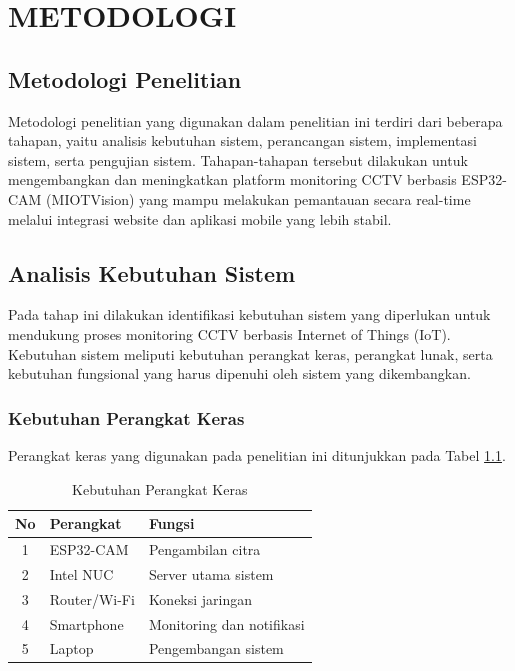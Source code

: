 \chapter{METODOLOGI}
\label{sec:chap3_metodologi}

\section{Metodologi Penelitian}

Metodologi penelitian yang digunakan dalam penelitian ini terdiri dari beberapa tahapan, yaitu analisis kebutuhan sistem, perancangan sistem, implementasi sistem, serta pengujian sistem. Tahapan-tahapan tersebut dilakukan untuk mengembangkan dan meningkatkan platform monitoring CCTV berbasis ESP32-CAM (MIOTVision) yang mampu melakukan pemantauan secara real-time melalui integrasi website dan aplikasi mobile yang lebih stabil.

\section{Analisis Kebutuhan Sistem}

Pada tahap ini dilakukan identifikasi kebutuhan sistem yang diperlukan untuk mendukung proses monitoring CCTV berbasis Internet of Things (IoT). Kebutuhan sistem meliputi kebutuhan perangkat keras, perangkat lunak, serta kebutuhan fungsional yang harus dipenuhi oleh sistem yang dikembangkan.

\subsection{Kebutuhan Perangkat Keras}

Perangkat keras yang digunakan pada penelitian ini ditunjukkan pada Tabel \ref{tab:hardware}.

\begin{table}[H]
	\centering
	\caption{Kebutuhan Perangkat Keras}
	\label{tab:hardware}
	\begin{tabular}{|c|l|l|}
		\hline
		No & Perangkat & Fungsi \\
		\hline
		1 & ESP32-CAM & Pengambilan citra \\
		2 & Intel NUC & Server utama sistem \\
		3 & Router/Wi-Fi & Koneksi jaringan \\
		4 & Smartphone & Monitoring dan notifikasi \\
		5 & Laptop & Pengembangan sistem \\
		\hline
	\end{tabular}
\end{table}

